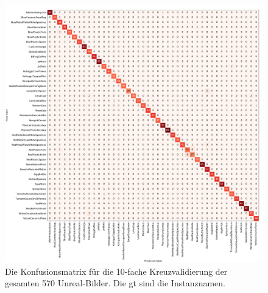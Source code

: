 \begin{figure}
	\includegraphics[scale=.4]{img/chapter6/UnrealGTInstance.png}
\caption[Konfusionsmatrix des gesamten Unreal-Bilder Datensatzes mit den Instanznamen als GT]{Die Konfusionsmatrix für die 10-fache Kreuzvalidierung der gesamten 570 Unreal-Bilder. Die \gls{gt} sind die Instanznamen.}
\label{fig:UnrealGTInstance_confMatrix}
\end{figure}

